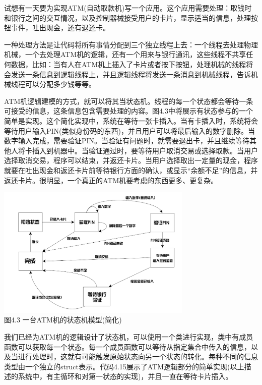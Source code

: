 试想有一天要为实现ATM(自动取款机)写一个应用。这个应用需要处理：取钱时和银行之间的交互情况，以及控制器械接受用户的卡片，显示适当的信息，处理按钮事件，吐出现金，还有退还卡。

一种处理方法是让代码将所有事情分配到三个独立线程上去：一个线程去处理物理机械，一个去处理ATM机的逻辑，还有一个用来与银行通讯，这些线程不共享任何数据，比如：当有人在ATM机上插入了卡片或者按下按钮，处理机械的线程将会发送一条信息到逻辑线程上，并且逻辑线程将发送一条消息到机械线程，告诉机械线程可以分配多少钱等等。

ATM机逻辑建模的方式，就可以将其当状态机。线程的每一个状态都会等待一条可接受的信息，这条信息包含需要处理的内容。图4.3中将展示有状态参与的一个简单是实现。这个简化实现中，系统在等待一张卡插入。当有卡插入时，系统将会等待用户输入PIN(类似身份码的东西)，并且用户可以将最后输入的数字删除。当数字输入完成，需要验证PIN。当验证有问题时，就需要退出卡，并且继续等待其他人将卡插入到机器中。当验证通过时，要等待用户取消交易或选择取款。当用户选择取消交易，程序可以结束，并返还卡片。当用户选择取出一定量的现金，程序就要在吐出现金和返还卡片前等待银行方面的确认，或显示“余额不足”的信息，并返还卡片。很明显，一个真正的ATM机要考虑的东西更多、更复杂。


\begin{center}
  \includegraphics[width=0.7\textwidth]{content/chapter04/images/4-3.png}\\
  图4.3 一台ATM机的状态机模型(简化)
\end{center}

我们已经为ATM机的逻辑设计了状态机，可以使用一个类进行实现，类中有成员函数可以获取每一个状态。每一个成员函数可以等待从指定集合中传入的信息，以及当进行处理时，这就有可能触发原始状态向另一个状态的转化。每种不同的信息类型由一个独立的struct表示。代码4.15展示了ATM逻辑部分的简单实现(以上描述的系统中，有主循环和对第一状态的实现)，并且一直在等待卡片插入。

